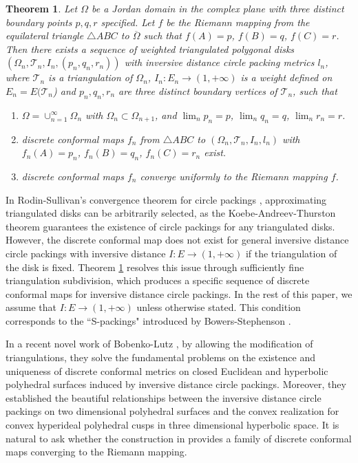 \documentclass[12pt]{amsart}
\newtheorem{theorem}{Theorem}[section]
\def\T{\mathcal{T}}
\begin{document}
\begin{theorem}\label{conv introduction}
Let $\Omega$ be a Jordan domain in the complex
plane with three distinct boundary points $p,q, r$ specified. Let $f$ be the Riemann mapping from the equilateral triangle $\triangle ABC$ to $\overline{\Omega}$   such that $f(A) = p$, $f(B) = q$, $f(C) = r$.
Then there exists a sequence of weighted triangulated polygonal disks $(\Omega_{n}, \T_n,
I_n, (p_n, q_n, r_n))$ with inversive distance circle packing metrics $l_n$, where $\T_n$ is a
triangulation of $\Omega_n$, $I_n: E_n\rightarrow (1, +\infty)$ is a weight defined on $E_n = E( \mathcal{T}_n$)
and $p_n, q_n, r_n$ are three distinct boundary vertices of $\mathcal{T}_n$, such that
\begin{enumerate}
  \item[(a)] $\Omega=\cup_{n=1}^{\infty} \Omega_n$ with $\Omega_n \subset
\Omega_{n+1}$, and  $\lim_n p_n =p$, $\lim_n q_n =q$, $\lim_n r_n=r$.
  \item[(b)] discrete conformal maps $f_n$ from $\triangle ABC$ to $(\Omega_{n},
\T_n,I_n, l_n)$  with  $f_n(A) = p_n$, $f_n(B) = q_n$, $f_n(C) = r_n$  exist.
  \item[(c)] discrete conformal maps $f_n$ converge uniformly to the Riemann mapping $f$.
\end{enumerate}
\end{theorem}



In Rodin-Sullivan's convergence theorem for circle packings \cite{RS}, approximating triangulated disks can be arbitrarily selected, as the Koebe-Andreev-Thurston theorem guarantees the existence of circle packings for any triangulated disks. However, the discrete conformal map does not exist for general inversive distance circle packings with inversive distance $I:E\to (1, +\infty)$ if  the triangulation of the disk is fixed. Theorem \ref{conv introduction} resolves this issue through sufficiently fine triangulation subdivision, which produces a specific sequence of discrete conformal maps for inversive distance circle packings.   In the rest of this paper, we assume that $I:E\to (1,+\infty)$ unless otherwise stated. This condition corresponds to the ``S-packings" introduced by Bowers-Stephenson \cite{BS}.

In a recent novel work of Bobenko-Lutz \cite{BL,BL2}, by allowing the modification of triangulations, they solve the fundamental problems on the existence and uniqueness of discrete conformal metrics on closed Euclidean and hyperbolic polyhedral surfaces induced by inversive distance circle packings. Moreover, they established the beautiful relationships between the inversive distance circle packings on two dimensional polyhedral surfaces and the convex realization for convex hyperideal polyhedral cusps in three dimensional hyperbolic space. It is natural to ask whether the construction in \cite{BL} provides a family of discrete conformal maps converging to the Riemann mapping. 
\end{document}
